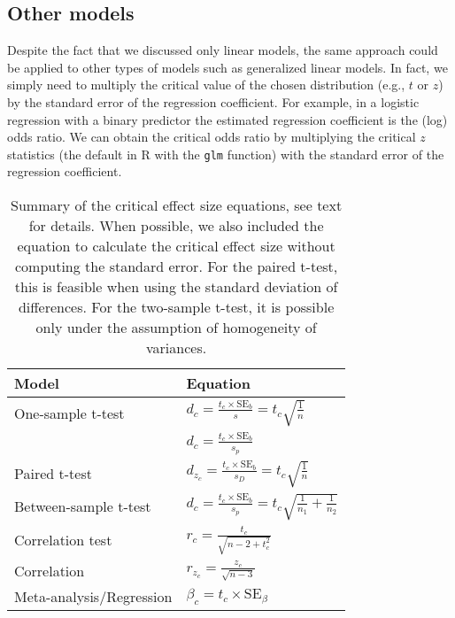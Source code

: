 \documentclass[
  man,floatsintext]{apa7}
\begin{document}
\hypertarget{other-models}{%
\subsection{Other models}\label{other-models}}

Despite the fact that we discussed only linear models, the same approach could be applied to other types of models such as generalized linear models. In fact, we simply need to multiply the critical value of the chosen distribution (e.g., \(t\) or \(z\)) by the standard error of the regression coefficient. For example, in a logistic regression with a binary predictor the estimated regression coefficient is the (log) odds ratio. We can obtain the critical odds ratio by multiplying the critical \(z\) statistics (the default in R with the \texttt{glm} function) with the standard error of the regression coefficient.

\footnotesize

\begin{table}[H]
\centering
\caption{\label{tab:eqsummary}Summary of the critical effect size equations, see text for details. When possible, we also included the equation to calculate the critical effect size without computing the standard error. For the paired t-test, this is feasible when using the standard deviation of differences. For the two-sample t-test, it is possible only under the assumption of homogeneity of variances.}
\centering
\begin{tabular}[t]{ll}
\toprule
\textbf{Model} & \textbf{Equation}\\
\midrule
One-sample t-test & $d_c = \frac{t_c \times \mbox{SE}_b}{s} = t_c\sqrt{\frac{1}{n}}$\\
\cmidrule{1-2}
 & $d_c = \frac{t_c \times \mbox{SE}_b}{s_p}$\\
\cmidrule{2-2}
\multirow{-2}{*}{\raggedright\arraybackslash Paired t-test} & $d_{z_c} = \frac{t_c \times \mbox{SE}_b}{s_D} = t_c\sqrt{\frac{1}{n}}$\\
\cmidrule{1-2}
Between-sample t-test & $d_c = \frac{t_c \times \mbox{SE}_b}{s_p} = t_c\sqrt{\frac{1}{n_1} + \frac{1}{n_2}}$\\
\cmidrule{1-2}
Correlation test & $r_c = \frac{t_c}{\sqrt{n - 2 + t^2_c}}$\\
\cmidrule{1-2}
Correlation & $r_{z_c} = \frac{z_c}{\sqrt{n - 3}}$\\
\cmidrule{1-2}
Meta-analysis/Regression & $\beta_c = t_c \times \mbox{SE}_{\beta}$\\
\bottomrule
\end{tabular}
\end{table}
\end{document}
